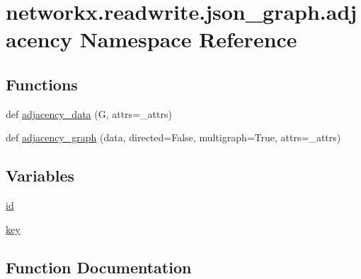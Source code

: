 \hypertarget{namespacenetworkx_1_1readwrite_1_1json__graph_1_1adjacency}{}\section{networkx.\+readwrite.\+json\+\_\+graph.\+adjacency Namespace Reference}
\label{namespacenetworkx_1_1readwrite_1_1json__graph_1_1adjacency}
\subsection*{Functions}
\begin{DoxyCompactItemize}
\item 
def \hyperlink{namespacenetworkx_1_1readwrite_1_1json__graph_1_1adjacency_aa5e4e6667992b2afe90358cef4add8bb}{adjacency\+\_\+data} (G, attrs=\+\_\+attrs)
\item 
def \hyperlink{namespacenetworkx_1_1readwrite_1_1json__graph_1_1adjacency_a039dc3a1a296edeae87c7a7b34411e18}{adjacency\+\_\+graph} (data, directed=False, multigraph=True, attrs=\+\_\+attrs)
\end{DoxyCompactItemize}
\subsection*{Variables}
\begin{DoxyCompactItemize}
\item 
\hyperlink{namespacenetworkx_1_1readwrite_1_1json__graph_1_1adjacency_a090f610144c26135556629351409fe09}{id}
\item 
\hyperlink{namespacenetworkx_1_1readwrite_1_1json__graph_1_1adjacency_ad4de1ce7756aa8ecaa98c2440b0498c4}{key}
\end{DoxyCompactItemize}


\subsection{Function Documentation}
\mbox{\label{namespacenetworkx_1_1readwrite_1_1json__graph_1_1adjacency_aa5e4e6667992b2afe90358cef4add8bb}} 
